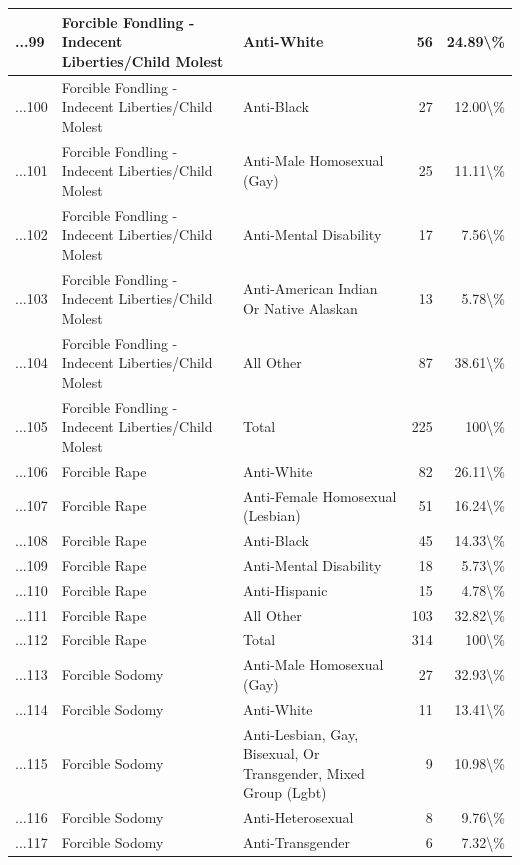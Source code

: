\documentclass[
]{krantz}
\begin{document}
\begin{longtable}[t]{l|l|l|r|r}
\hline
...99 & Forcible Fondling - Indecent Liberties/Child Molest & Anti-White & 56 & 24.89\textbackslash{}\%\\
\hline
...100 & Forcible Fondling - Indecent Liberties/Child Molest & Anti-Black & 27 & 12.00\textbackslash{}\%\\
\hline
...101 & Forcible Fondling - Indecent Liberties/Child Molest & Anti-Male Homosexual (Gay) & 25 & 11.11\textbackslash{}\%\\
\hline
...102 & Forcible Fondling - Indecent Liberties/Child Molest & Anti-Mental Disability & 17 & 7.56\textbackslash{}\%\\
\hline
...103 & Forcible Fondling - Indecent Liberties/Child Molest & Anti-American Indian Or Native Alaskan & 13 & 5.78\textbackslash{}\%\\
\hline
...104 & Forcible Fondling - Indecent Liberties/Child Molest & All Other & 87 & 38.61\textbackslash{}\%\\
\hline
...105 & Forcible Fondling - Indecent Liberties/Child Molest & Total & 225 & 100\textbackslash{}\%\\
\hline
...106 & Forcible Rape & Anti-White & 82 & 26.11\textbackslash{}\%\\
\hline
...107 & Forcible Rape & Anti-Female Homosexual (Lesbian) & 51 & 16.24\textbackslash{}\%\\
\hline
...108 & Forcible Rape & Anti-Black & 45 & 14.33\textbackslash{}\%\\
\hline
...109 & Forcible Rape & Anti-Mental Disability & 18 & 5.73\textbackslash{}\%\\
\hline
...110 & Forcible Rape & Anti-Hispanic & 15 & 4.78\textbackslash{}\%\\
\hline
...111 & Forcible Rape & All Other & 103 & 32.82\textbackslash{}\%\\
\hline
...112 & Forcible Rape & Total & 314 & 100\textbackslash{}\%\\
\hline
...113 & Forcible Sodomy & Anti-Male Homosexual (Gay) & 27 & 32.93\textbackslash{}\%\\
\hline
...114 & Forcible Sodomy & Anti-White & 11 & 13.41\textbackslash{}\%\\
\hline
...115 & Forcible Sodomy & Anti-Lesbian, Gay, Bisexual, Or Transgender, Mixed Group (Lgbt) & 9 & 10.98\textbackslash{}\%\\
\hline
...116 & Forcible Sodomy & Anti-Heterosexual & 8 & 9.76\textbackslash{}\%\\
\hline
...117 & Forcible Sodomy & Anti-Transgender & 6 & 7.32\textbackslash{}\%\\

\end{longtable}
\end{document}
